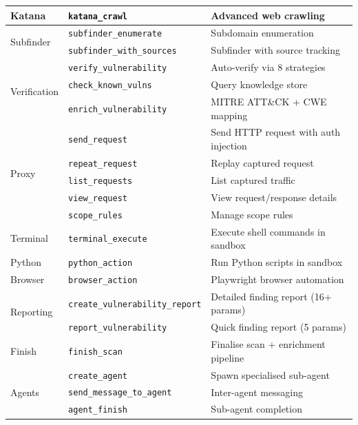 \documentclass[11pt,a4paper]{article}
\begin{document}
{\begin{longtable}{llp{5.5cm}}
\midrule
Katana      & \texttt{katana\_crawl}            & Advanced web crawling \\
\midrule
\multirow{2}{*}{Subfinder}
            & \texttt{subfinder\_enumerate}     & Subdomain enumeration \\
            & \texttt{subfinder\_with\_sources}  & Subfinder with source tracking \\
\midrule
\multirow{3}{*}{Verification}
            & \texttt{verify\_vulnerability}     & Auto-verify via 8 strategies \\
            & \texttt{check\_known\_vulns}       & Query knowledge store \\
            & \texttt{enrich\_vulnerability}     & MITRE ATT\&CK + CWE mapping \\
\midrule
\multirow{5}{*}{Proxy}
            & \texttt{send\_request}            & Send HTTP request with auth injection \\
            & \texttt{repeat\_request}          & Replay captured request \\
            & \texttt{list\_requests}           & List captured traffic \\
            & \texttt{view\_request}            & View request/response details \\
            & \texttt{scope\_rules}             & Manage scope rules \\
\midrule
Terminal    & \texttt{terminal\_execute}         & Execute shell commands in sandbox \\
Python      & \texttt{python\_action}            & Run Python scripts in sandbox \\
Browser     & \texttt{browser\_action}           & Playwright browser automation \\
\midrule
\multirow{2}{*}{Reporting}
            & \texttt{create\_vulnerability\_report} & Detailed finding report (16+ params) \\
            & \texttt{report\_vulnerability}     & Quick finding report (5 params) \\
\midrule
Finish      & \texttt{finish\_scan}              & Finalise scan + enrichment pipeline \\
\midrule
\multirow{3}{*}{Agents}
            & \texttt{create\_agent}             & Spawn specialised sub-agent \\
            & \texttt{send\_message\_to\_agent}  & Inter-agent messaging \\
            & \texttt{agent\_finish}             & Sub-agent completion \\
\end{longtable}
}
\end{document}
